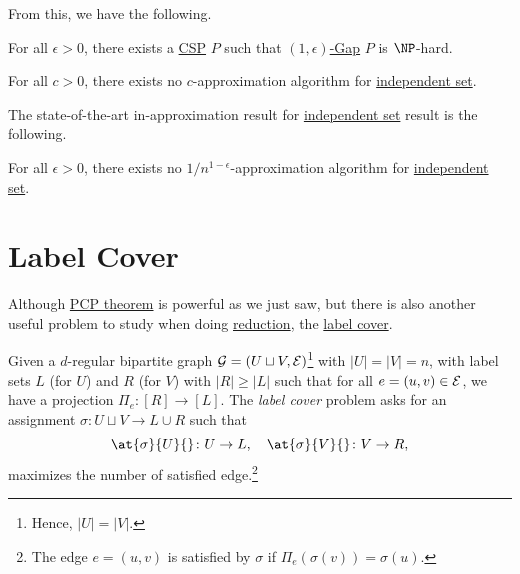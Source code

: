 From this, we have the following.

\begin{theorem}
	For all \(\epsilon > 0\), there exists a \hyperref[prb:CSP]{CSP} \(P\) such that \hyperref[def:c-s-Gap]{\((1, \epsilon )\)-Gap} \(P\) is \(\NP\)-hard.
\end{theorem}
\begin{corollary}
	For all \(c > 0\), there exists no \(c\)-approximation algorithm for \hyperref[prb:independent-set]{independent set}.
\end{corollary}

The state-of-the-art in-approximation result for \hyperref[prb:independent-set]{independent set} result is the following.

\begin{theorem}
	For all \(\epsilon > 0\), there exists no \(1 / n^{1-\epsilon }\)-approximation algorithm for \hyperref[prb:independent-set]{independent set}.
\end{theorem}

\section{Label Cover}
Although \hyperref[thm:PCP]{PCP theorem} is powerful as we just saw, but there is also another useful problem to study when doing \hyperref[def:reduction]{reduction}, the \hyperref[prb:label-cover]{label cover}.

\begin{problem}\label{prb:label-cover}
Given a \(d\)-regular bipartite graph \(\mathcal{\MakeUppercase{g}} =(U\sqcup V , \mathcal{\MakeUppercase{e}} )\)\footnote{Hence, \(\vert U \vert = \vert V \vert\).} with \(\vert U \vert = \vert V \vert = n\), with label sets \(L\) (for \(U\)) and \(R\) (for \(V \)) with \(\vert R \vert \geq \vert L \vert \) such that for all \(e=(u, v)\in \mathcal{\MakeUppercase{e}} \), we have a projection \(\Pi _e \colon [R]\to [L]\). The \emph{label cover} problem asks for an assignment \(\sigma\colon U \sqcup V \to L \cup R\) such that
\[
	\at{\sigma }{U}{} \colon U \to L,\quad \at{\sigma }{V}{} \colon V \to R,
\]
maximizes the number of satisfied edge.\footnote{The edge \(e=(u, v)\) is satisfied by \(\sigma \) if \(\Pi _e(\sigma (v)) = \sigma (u)\).}
\end{problem}

\begin{center}
\end{center}

